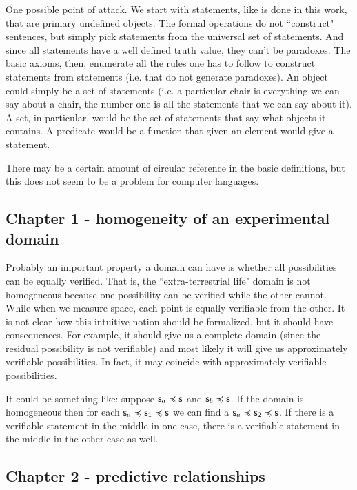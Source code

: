 \documentclass[11pt,letterpaper,fleqn]{memoir} %
\begin{document}
One possible point of attack. We start with statements, like is done in this work, that are primary undefined objects. The formal operations do not ``construct" sentences, but simply pick statements from the universal set of statements. And since all statements have a well defined truth value, they can't be paradoxes. The basic axioms, then, enumerate all the rules one has to follow to construct statements from statements (i.e. that do not generate paradoxes). An object could simply be a set of statements (i.e. a particular chair is everything we can say about a chair, the number one is all the statements that we can say about it). A set, in particular, would be the set of statements that say what objects it contains. A predicate would be a function that given an element would give a statement. 

There may be a certain amount of circular reference in the basic definitions, but this does not seem to be a problem for computer languages.

\subsection{Chapter 1 - homogeneity of an experimental domain}

Probably an important property a domain can have is whether all possibilities can be equally verified. That is, the ``extra-terrestrial life" domain is not homogeneous because one possibility can be verified while the other cannot. While when we measure space, each point is equally verifiable from the other. It is not clear how this intuitive notion should be formalized, but it should have consequences. For example, it should give us a complete domain (since the residual possibility is not verifiable) and most likely it will give us approximately verifiable possibilities. In fact, it may coincide with approximately verifiable possibilities.

It could be something like: suppose $\mathsf{s}_a \preccurlyeq \mathsf{s}$ and $\mathsf{s}_b \preccurlyeq \mathsf{s}$. If the domain is homogeneous then for each $\mathsf{s}_a \preccurlyeq \mathsf{s}_1 \preccurlyeq \mathsf{s}$ we can find a $\mathsf{s}_a \preccurlyeq \mathsf{s}_2 \preccurlyeq \mathsf{s}$. If there is a verifiable statement in the middle in one case, there is a verifiable statement in the middle in the other case as well.

\subsection{Chapter 2 - predictive relationships}
\end{document}
